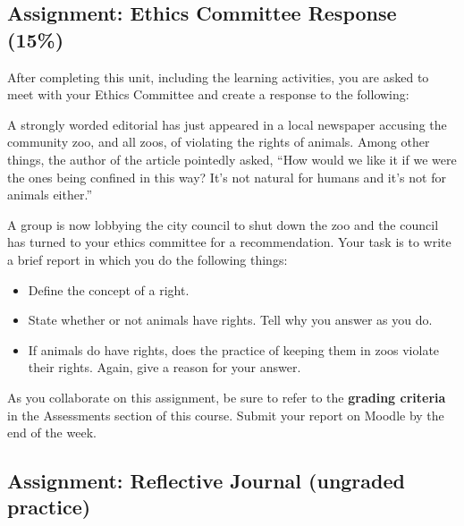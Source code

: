 \documentclass[
]{book}
\providecommand{\tightlist}{%
  \setlength{\itemsep}{0pt}\setlength{\parskip}{0pt}}
\begin{document}
\begin{assessment}
\hypertarget{assignment-ethics-committee-response-15}{%
\subsection*{Assignment: Ethics Committee Response (15\%)}\label{assignment-ethics-committee-response-15}}

After completing this unit, including the learning activities, you are asked to
meet with your Ethics Committee and create a response to the following:

A strongly worded editorial has just appeared in a local newspaper accusing the community zoo, and all zoos, of violating the rights of animals. Among other things, the author of the article pointedly asked, ``How would we like it if we were the ones being confined in this way? It's not natural for humans and it's not for animals either.''

A group is now lobbying the city council to shut down the zoo and the council has turned to your ethics committee for a recommendation. Your task is to write a brief report in which you do the following things:

\begin{itemize}
\tightlist
\item
  Define the concept of a right.\\
\item
  State whether or not animals have rights. Tell why you answer as you do.\\
\item
  If animals do have rights, does the practice of keeping them in zoos violate their rights. Again, give a reason for your answer.
\end{itemize}

As you collaborate on this assignment, be sure to refer to the \textbf{grading
criteria} in the Assessments section of this course. Submit your report on
Moodle by the end of the week.

\hypertarget{assignment-reflective-journal-ungraded-practice-2}{%
\subsection*{Assignment: Reflective Journal (ungraded practice)}\label{assignment-reflective-journal-ungraded-practice-2}}


\end{assessment}
\end{document}
